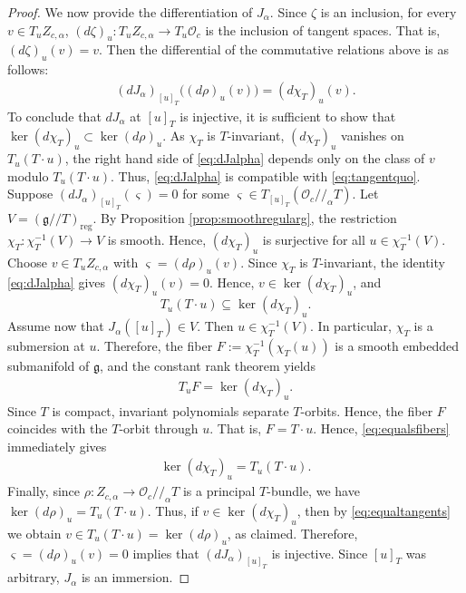 \documentclass[11pt,reqno]{amsart}
\newtheorem*{theorem A}{Main Theorem A}
\newtheorem*{theorem B}{Main Theorem B}
\newtheorem*{theorem C}{Main Theorem C}
\newtheorem*{theorem D}{Main Theorem D}
\theoremstyle{definition}
\theoremstyle{plain}
\theoremstyle{conclusion}
\begin{document}
\begin{proof}
We now provide the differentiation of $J_\alpha$. Since $\zeta$ is an inclusion, for every $v\in T_uZ_{c,\alpha}$, $(d \zeta)_u: T_u Z_{c,\alpha} \to T_u \mathcal{O}_c$ is the inclusion of tangent spaces. That is, $(d\zeta)_u(v) = v$. Then the differential of the commutative relations above is as follows: \begin{align}
(dJ_\alpha)_{[u]_T}\big((d\rho)_u(v)\big) =(d\chi_T)_u(v).\label{eq:dJalpha}
\end{align} To conclude that $dJ_\alpha$ at $[u]_T$ is injective, it is sufficient to show that $\ker (d \chi_T)_u \subset \ker (d \rho)_u $. As $\chi_T$ is $T$-invariant, $(d\chi_T)_u$ vanishes on $T_u(T\cdot u)$, the right hand side of \eqref{eq:dJalpha} depends only on the class of $v$ modulo $T_u(T\cdot u)$. Thus, \eqref{eq:dJalpha} is compatible with \eqref{eq:tangentquo}. Suppose $(dJ_\alpha)_{[u]_T}(\varsigma)=0$ for some $\varsigma\in T_{[u]_T}(\mathcal{O}_c//_\alpha T)$. Let $V = (\mathfrak{g}//T)_\mathrm{reg}$. By Proposition \ref{prop:smoothregularg}, the restriction $\chi_T:\chi_T^{-1}(V)\to V$ is smooth. Hence, $(d\chi_T)_u$ is surjective for all $u\in\chi_T^{-1}(V)$. %
Choose $v\in T_uZ_{c,\alpha}$ with $\varsigma=(d\rho)_u(v)$. Since $\chi_T$ is $T$-invariant, the identity \eqref{eq:dJalpha} gives $(d\chi_T)_u(v)=0$. Hence, $v\in\ker(d\chi_T)_u$, and $$T_u(T\cdot u)\subseteq \ker(d\chi_T)_u.$$  Assume now that $J_\alpha([u]_T)\in V$. Then $u\in \chi_T^{-1}(V)$. In particular, $\chi_T$ is a submersion at $u$. Therefore, the fiber $ F:=\chi_T^{-1}(\chi_T(u))$ is a smooth embedded submanifold of $\mathfrak{g}$, and the constant rank theorem yields \begin{align}
T_uF=\ker(d\chi_T)_u . \label{eq:equalsfibers}
\end{align} Since $T$ is compact, invariant polynomials separate $T$-orbits. Hence, the fiber $F$ coincides with the $T$-orbit through $u$. That is, $ F=T\cdot u $. Hence, \eqref{eq:equalsfibers} immediately gives \begin{align}
\ker(d\chi_T)_u = T_u(T\cdot u). \label{eq:equaltangents}
\end{align} Finally, since $\rho: Z_{c,\alpha}\longrightarrow \mathcal{O}_c//_{\alpha}T$ is a principal $T$-bundle, we have $\ker(d\rho)_u = T_u(T\cdot u)$. Thus, if $v\in \ker(d\chi_T)_u$, then by \eqref{eq:equaltangents} we obtain $v\in T_u(T\cdot u)=\ker(d\rho)_u$, as claimed.
Therefore, $\varsigma=(d\rho)_u(v)=0$ implies that $(dJ_\alpha)_{[u]_T}$ is injective. Since $[u]_T$ was arbitrary, $J_\alpha$ is an immersion.


\end{proof}
\end{document}
